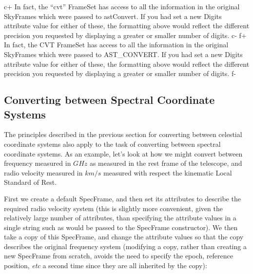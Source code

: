\documentclass[twoside,11pt]{starlink}
\begin{document}
c+
In fact, the ``cvt'' FrameSet has access to all the information in the
original SkyFrames which were passed to astConvert. If you had set a
new Digits attribute value for either of these, the formatting above
would reflect the different precision you requested by displaying a
greater or smaller number of digits.
c-
f+
In fact, the CVT FrameSet has access to all the information in the
original SkyFrames which were passed to AST\_CONVERT. If you had set a
new Digits attribute value for either of these, the formatting above
would reflect the different precision you requested by displaying a
greater or smaller number of digits.
f-


\subsection{\label{ss:convertingspecframes}Converting between Spectral Coordinate Systems}
The principles described in the previous section for converting between
celestial coordinate systems also apply to the task of converting between
spectral coordinate systems. As an example, let's look at how we might
convert between frequency measured in $GHz$ as measured in the rest frame
of the telescope, and radio velocity measured in $km/s$ measured with
respect the kinematic Local Standard of Rest.

First we create a default SpecFrame, and then set its attributes to
describe the required radio velocity system (this is slightly more
convenient, given the relatively large number of attributes, than
specifying the attribute values in a single string such as would be
passed to the SpecFrame constructor). We then take a copy of this
SpecFrame, and change the attribute values so that the copy describes the
original frequency system (modifying a copy, rather than creating a new
SpecFrame from scratch, avoids the need to specify the epoch, reference
position, \emph{etc} a second time since they are all inherited by the copy):
\end{document}
